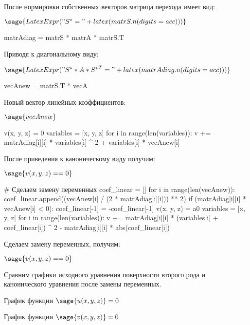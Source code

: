 После нормировки собственных векторов матрица перехода имеет вид:

$\sage{LatexExpr("S^* = " + latex(matrS.n(digits = acc)))}$

\begin{sagesilent}
    matrAdiag = matrS * matrA * matrS.T
\end{sagesilent}

Приводя к диагональному виду:

$\sage{LatexExpr("S^{*} * A * {S^{*}}^T = " + latex(matrAdiag.n(digits = acc)))}$

\begin{sagesilent}
    vecAnew = matrS.T * vecA
\end{sagesilent}

Новый вектор линейных коэффициентов:

$\sage{vecAnew}$

\begin{sagesilent}
    v(x, y, z) = 0
    variables = [x, y, z]
    for i in range(len(variables)):
        v += matrAdiag[i][i] * variables[i] ^ 2 + variables[i] * vecAnew[i]
\end{sagesilent}

После приведения к каноническому виду получим:

$\sage{v(x, y, z) == 0}$

\begin{sagesilent}
    # Сделаем замену переменных
    coef_linear = []
    for i in range(len(vecAnew)):
        coef_linear.append((vecAnew[i] / (2 * matrAdiag[i][i])) ** 2)
        if (matrAdiag[i][i] * vecAnew[i] < 0):
            coef_linear[-1] = -coef_linear[-1]
    v(x, y, z) = a0
    variables = [x, y, z]
    for i in range(len(variables)):
        v += matrAdiag[i][i] * (variables[i] + coef_linear[i]) ^ 2 - matrAdiag[i][i] * abs(coef_linear[i])
\end{sagesilent}

Сделаем замену переменных, получим:

$\sage{v(x, y, z) == 0}$

\pagebreak

Сравним графики исходного уравнения поверхности второго рода и канонического уравнения после замены переменных.

График функции $\sage{u(x, y, z)} = 0$
\begin{center}
\end{center}

График функции $\sage{v(x, y, z)} = 0$
\begin{center}
\end{center}
